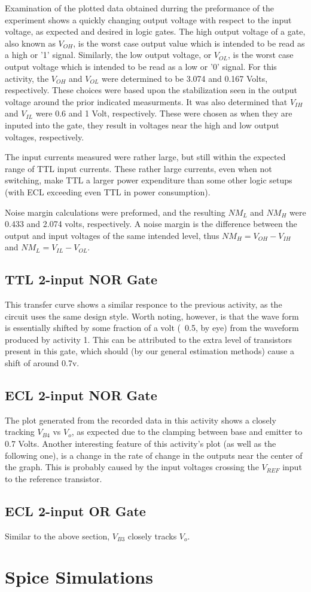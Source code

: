 \documentclass[10pt]{article}
\begin{document}
Examination of the plotted data obtained durring the preformance of the
experiment shows a quickly changing output voltage with respect to the
input voltage, as expected and desired in logic gates. The high output
voltage of a gate, also known as $V_{OH}$, is the worst case output value
which is intended to be read as a high or '1' signal. Similarly, the low
output voltage, or $V_{OL}$, is the worst case output voltage which is
intended to be read as a low or '0' signal. For this activity, the $V_{OH}$ and
$V_{OL}$ were determined to be 3.074 and 0.167 Volts, respectively. These
choices were based upon the stabilization seen in the output voltage
around the prior indicated measurments. It was also determined that
$V_{IH}$ and $V_{IL}$ were 0.6 and 1 Volt, respectively. These were chosen
as when they are inputed into the gate, they result in voltages near the
high and low output voltages, respectively.

The input currents measured were rather large, but still within the
expected range of TTL input currents. These rather large currents, even
when not switching, make TTL a larger power expenditure than some other
logic setups (with ECL exceeding even TTL in power consumption).

Noise margin calculations were preformed, and the resulting $NM_L$ and
$NM_H$ were 0.433 and 2.074 volts, respectively. A noise margin is the
difference between the output and input voltages of the same intended
level, thus $NM_H = V_{OH} - V_{IH}$ and $NM_L = V_{IL} - V_{OL}$.

\subsection{TTL 2-input NOR Gate}

This transfer curve shows a similar responce to the previous activity, as
the circuit uses the same design style. Worth noting, however, is that the
wave form is essentially shifted by some fraction of a volt (~0.5, by eye)
from the waveform produced by activity 1. This can be attributed to the
extra level of transistors present in this gate, which should (by our
general estimation methods) cause a shift of around 0.7v.


\subsection{ECL 2-input NOR Gate}

The plot generated from the recorded data in this activity shows a closely
tracking $V_{B4}$ vs $V_o$, as expected due to the clamping between base
and emitter to 0.7 Volts. Another interesting feature of this activity's
plot (as well as the following one), is a change in the rate of change in
the outputs near the center of the graph. This is probably caused by the
input voltages crossing the $V_{REF}$ input to the reference transistor.

\subsection{ECL 2-input OR Gate}

Similar to the above section, $V_{B3}$ closely tracks $V_o$.

\section{Spice Simulations}

\end{document}
